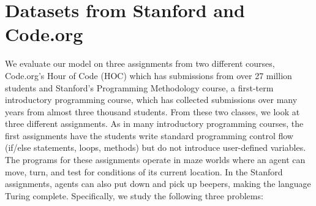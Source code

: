 

\section{Datasets from Stanford and Code.org}\label{sec:data}

\begin{table}[t]
  \centering
  \caption[Encoding dataset summary]{Dataset summary. Programs are considered identical if they have equal ASTs. Unique states are different configurations of the gridworld which occur in student programs.}
  \label{tab:datasummary}
\end{table}

We evaluate our model on three assignments from two different courses, Code.org's Hour of Code (HOC) which has submissions from over 27 million students and Stanford’s Programming Methodology course, a first-term introductory programming course, which has collected submissions over many years from almost three thousand students. From these two classes, we look at three different assignments. As in many introductory programming courses, the first assignments have the students write standard programming control flow (if/else statements, loops, methods) but do not introduce user-defined variables. The programs for these assignments operate in maze worlds where an agent can move, turn, and test for conditions of its current location. In the Stanford assignments, agents can also put down and pick up beepers, 
making the language Turing complete.  Specifically, we study
the following three problems:

